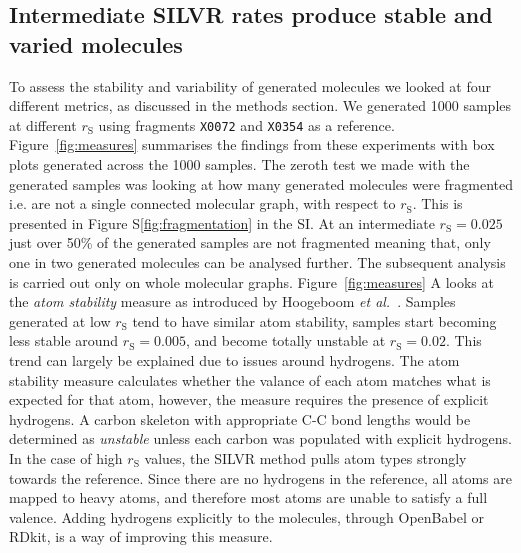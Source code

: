 \documentclass[journal=jacsat,manuscript=article]{achemso}
\begin{document}
\subsection{Intermediate SILVR rates produce stable and varied molecules}
To assess the stability and variability of generated molecules we looked at four different metrics, as discussed in the methods section. We generated 1000 samples at different $r_{\mathrm{S}}$ using fragments \texttt{X0072} and \texttt{X0354} as a reference. Figure~\ref{fig:measures} summarises the findings from these experiments with box plots generated across the 1000 samples. The zeroth test we made with the generated samples was looking at how many generated molecules were fragmented i.e. are not a single connected molecular graph, with respect to $r_{\mathrm{S}}$. This is presented in Figure S\ref{fig:fragmentation} in the SI. At an intermediate $r_{\mathrm{S}} = 0.025$ just over 50\% of the generated samples are not fragmented meaning that, only one in two generated molecules can be analysed further. The subsequent analysis is carried out only on whole molecular graphs. 
Figure~\ref{fig:measures} A looks at the \textit{atom stability} measure as introduced by Hoogeboom \textit{et al.}~\cite{hoogeboom2022equivariant}. Samples generated at low $r_{\mathrm{S}}$ tend to have similar atom stability, samples start becoming less stable around $r_{\mathrm{S}}=0.005$, and become totally unstable at $r_{\mathrm{S}}=0.02$. This trend can largely be explained due to issues around hydrogens. The atom stability measure calculates whether the valance of each atom matches what is expected for that atom, however, the measure requires the presence of explicit hydrogens. A carbon skeleton with appropriate C-C bond lengths would be determined as \textit{unstable} unless each carbon was populated with explicit hydrogens. In the case of high $r_{\mathrm{S}}$ values, the SILVR method pulls atom types strongly towards the reference. Since there are no hydrogens in the reference, all atoms are mapped to heavy atoms, and therefore most atoms are unable to satisfy a full valence. Adding hydrogens explicitly to the molecules, through OpenBabel or RDkit, is a way of improving this measure. 
\end{document}
